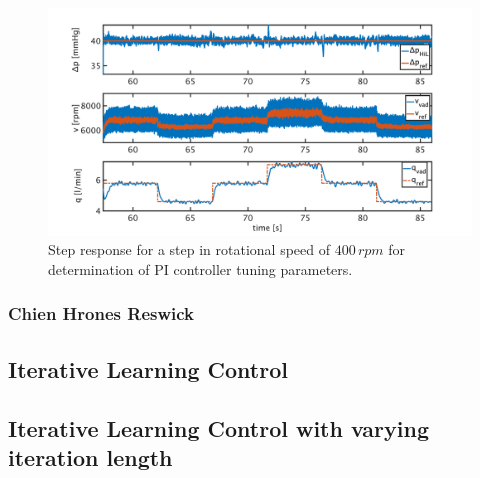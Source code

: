 \begin{figure}[ht]
  \centering
  \includegraphics[width=\textwidth]{images/chapt_5/pi_contr_zn_40.pdf}
  \caption[Step response for determination of PI controller tuning parameters]{Step response for a step in rotational speed of $400\,rpm$ for determination of PI controller tuning parameters.}
  \label{fig:pi_contr_zn_40}
\end{figure}
\subsubsection{Chien Hrones Reswick}
\subsection{Iterative Learning Control}
\subsection{Iterative Learning Control with varying iteration length}
%
%
